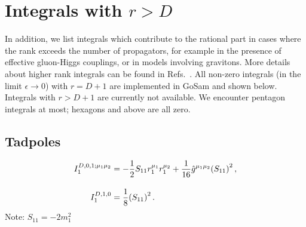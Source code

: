 \documentclass[11pt,a4paper]{refrep}
\newcommand{\gosam}{{\sc GoSam}\xspace}
\newcommand{\diff}[1][{}]{{\mathrm{d}}^{#1}\!}
\newcommand{\bea}{\begin{eqnarray*}}
\newcommand{\eea}{\end{eqnarray*}\noindent}
\newcommand{\be}{\begin{equation}}
\newcommand{\ee}{\end{equation}}
\newcommand{\nn}{\nonumber}
\def\eps{\epsilon}
\begin{document}
\section*{Integrals with \boldmath$r>D$}
In addition, we list integrals which contribute to the rational part in cases where the rank exceeds the number of
propagators, for example in the presence of effective gluon-Higgs couplings, or in models involving
gravitons.
More details about higher rank integrals can be found in
Refs.~\cite{Guillet:2013msa,Mastrolia:2012bu,vanDeurzen:2013pja}. All non-zero integrals (in the limit $\epsilon\to0$) with $r=D+1$ are implemented in \gosam and shown below. Integrals with $r>D+1$ are currently not available. We encounter pentagon integrals at most; hexagons and above are all zero.

\subsection*{Tadpoles}
\begin{subequations}
\begin{align}
  I_1^{D,0,1;\mu_1\mu_2} &= -\frac{1}{2}S_{11}r_1^{\mu_1}r_1^{\mu_2}+\frac{1}{16}\hat{g}^{\mu_1\mu_2}\qty(S_{11})^2\,,\\[10pt]
%
  I_1^{D,1,0} &= \frac{1}{8}\qty(S_{11})^2\,.
\end{align}
\end{subequations}
Note: $S_{11}=-2m_1^2$
\end{document}
